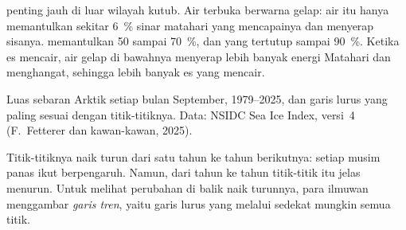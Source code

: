  penting jauh di luar wilayah kutub. Air  terbuka berwarna
gelap: air itu hanya memantulkan sekitar 6~\% sinar matahari yang
mencapainya dan menyerap sisanya.  memantulkan 50 sampai 70~\%, dan
 yang tertutup  sampai 90~\%. Ketika es mencair, air gelap di
bawahnya menyerap lebih banyak energi Matahari dan menghangat, sehingga
lebih banyak es yang mencair.

\begin{omfigure}

{\small Luas sebaran  Arktik setiap bulan September, 1979--2025,
dan garis lurus yang paling sesuai dengan titik-titiknya. Data: NSIDC Sea
Ice Index, versi~4 (F.~Fetterer dan kawan-kawan, 2025).}
\label{fig:g8:ice-on-earth:sea-ice}
\end{omfigure}

Titik-titiknya naik turun dari satu tahun ke tahun berikutnya: 
setiap musim panas ikut berpengaruh. Namun, dari tahun ke tahun titik-titik
itu jelas menurun. Untuk melihat perubahan di balik naik turunnya, para
ilmuwan menggambar \emph{garis tren}, yaitu garis lurus yang melalui
sedekat mungkin semua titik.

